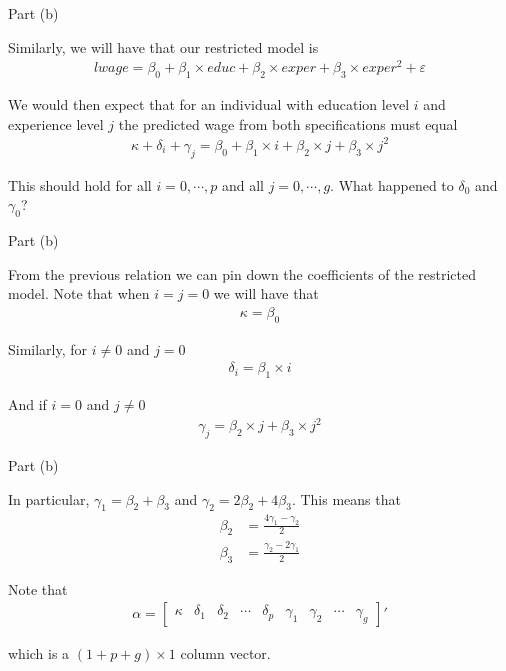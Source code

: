 \begin{frame}{Part (b)}

    Similarly, we will have that our restricted model is
    \begin{align*}
        lwage = \beta_0 + \beta_1 \times educ + \beta_2 \times exper + \beta_3 \times exper^2 + \varepsilon    
    \end{align*}

    We would then expect that for an individual with education level $i$ and experience level $j$ the predicted wage from both specifications must equal
    \begin{align*}
        \kappa + \delta_i + \gamma_j = \beta_0 + \beta_1 \times i + \beta_2 \times j + \beta_3 \times j^2
    \end{align*}

    This should hold for all $i = 0, \cdots, p$ and all $j = 0, \cdots, g$. What happened to $\delta_0$ and $\gamma_0$?

\end{frame}

\begin{frame}{Part (b)}

    From the previous relation we can pin down the coefficients of the restricted model. Note that when $i = j = 0$ we will have that
    \begin{align*}
        \kappa = \beta_0
    \end{align*}
    
    Similarly, for $i \neq 0$ and $j = 0$
    \begin{align*}
        \delta_i = \beta_1 \times i
    \end{align*}
    
    And if $i = 0$ and $j \neq 0$
    \begin{align*}
        \gamma_j = \beta_2 \times j + \beta_3 \times j^2
    \end{align*}
    
\end{frame}

\begin{frame}{Part (b)}

    In particular, $\gamma_1 = \beta_2 + \beta_3$ and $\gamma_2 = 2 \beta_2 + 4 \beta_3$. This means that
    \begin{align*}
        \beta_2 &= \frac{4 \gamma_1 - \gamma_2}{2}
        \\
        \beta_3 &= \frac{\gamma_2 - 2 \gamma_1}{2}
    \end{align*}

    Note that
    \begin{align*}
        \alpha = \begin{bmatrix}
                    \kappa & \delta_1 & \delta_2 & \cdots & \delta_p & \gamma_1 & \gamma_2 & \cdots & \gamma_g
                \end{bmatrix}'
    \end{align*}

    which is a $(1 + p + g) \times 1$ column vector.
    
\end{frame}

